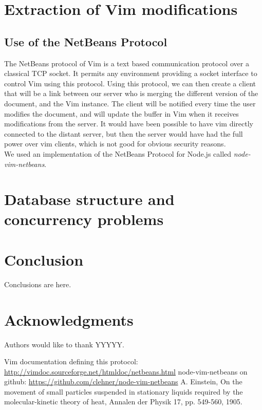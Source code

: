 \documentclass{llncs}
\begin{document}
\section{Extraction of Vim modifications}\label{sec:Others}

\subsection{Use of the NetBeans Protocol}

The NetBeans protocol of Vim is a text based communication protocol over a classical TCP socket. It permits any environment providing a socket interface to control Vim using this protocol.\cite{netbeans} Using this protocol, we can then create a client that will be a link between our server who is merging the different version of the document, and the Vim instance. The client will be notified every time the user modifies the document, and will update the buffer in Vim when it receives modifications from the server. It would have been possible to have vim directly connected to the distant server, but then the server would have had the full power over vim clients, which is not good for obvious security reasons.\\
We used an implementation of the NetBeans Protocol for Node.js called \textit{node-vim-netbeans}.


\section{Database structure and concurrency problems}\label{sec:Others}

\section{Conclusion}\label{sec:Conclusion}

Conclusions are here.

\section*{Acknowledgments}\label{sec:Acknowledgments}

Authors would like to thank YYYYY.

\begin{thebibliography}{1}

Vim documentation defining this protocol: \url{http://vimdoc.sourceforge.net/htmldoc/netbeans.html}
node-vim-netbeans on github: \url{https://github.com/clehner/node-vim-netbeans}
A. Einstein, On the movement of small particles suspended in stationary liquids required by the molecular-kinetic theory of heat, Annalen der Physik 17, pp. 549-560, 1905.

\end{thebibliography}
\end{document}
